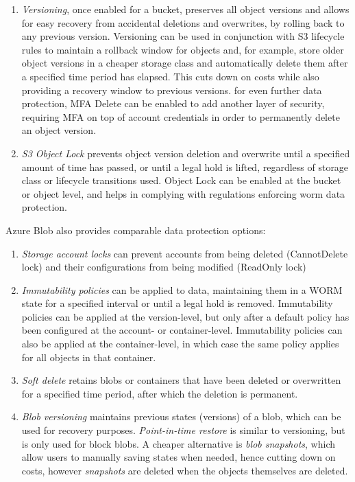 \begin{enumerate}
    \item \textit{Versioning}, once enabled for a bucket, preserves all object versions and allows for easy recovery from accidental deletions and overwrites, by rolling back to any previous version. Versioning can be used in conjunction with S3 lifecycle rules to maintain a rollback window for objects and, for example, store older object versions in a cheaper storage class and automatically delete them after a specified time period has elapsed. This cuts down on costs while also providing a recovery window to previous versions. for even further data protection, MFA Delete can be enabled to add another layer of security, requiring MFA on top of account credentials in order to permanently delete an object version.

    \item \textit{S3 Object Lock} prevents object version deletion and overwrite until a specified amount of time has passed, or until a legal hold is lifted, regardless of storage class or lifecycle transitions used. Object Lock can be enabled at the bucket or object level, and helps in complying with regulations enforcing  \ac{worm} data protection.
\end{enumerate}


Azure Blob also provides comparable data protection options: ~\cite{blob_data_protection}

\begin{enumerate}
    \item \textit{Storage account locks} can prevent accounts from being deleted (CannotDelete lock)  and their configurations from being modified (ReadOnly lock)

    \item \textit{Immutability policies} can be applied to data, maintaining them in a WORM state for a specified interval or until a legal hold is removed. Immutability policies can be applied at the version-level, but only after a default policy has been configured at the account- or container-level. Immutability policies can also be applied at the container-level, in which case the same policy applies for all objects in that container.

    \item \textit{Soft delete} retains blobs or containers that have been deleted or overwritten for a specified time period, after which the deletion is permanent.

    \item \textit{Blob versioning} maintains previous states (versions) of a blob, which can be used for recovery purposes.  \textit{Point-in-time restore} is similar to versioning, but is only used for block blobs. A cheaper alternative is \textit{blob snapshots}, which allow users to manually saving states when needed, hence cutting down on costs, however \textit{snapshots }are deleted when the objects themselves are deleted.
\end{enumerate}

